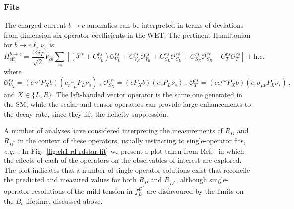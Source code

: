 \subsubsection{Fits}

The charged-current $b \to c$ anomalies can be interpreted in terms of
deviations from dimension-six operator coefficients in the WET. The pertinent
Hamiltonian for $b \to c \ell_{r} \nu_{s}$ is
\begin{equation}
  \label{eq:ch1-bctaunu-ham}
  H^{b\to c}_{\text{eff}} = \frac{4 G_{F}}{\sqrt{2}} V_{cb} \sum_{rs} [(\delta^{rs} + C^{rs}_{V_{L}}) \mathcal{O}^{rs}_{V_{L}} + C_{V_{R}}^{rs} \mathcal{O}^{rs}_{V_{R}} + C^{rs}_{S_{L}}\mathcal{O}^{rs}_{S_{L}} + C^{rs}_{S_{R}}\mathcal{O}^{rs}_{S_{R}} + C^{rs}_{T}\mathcal{O}^{rs}_{T}] + \text{h.c.}
\end{equation}
where
\begin{equation}
  \label{eq:ch1-rdrdstar-ops}
  \mathcal{O}^{rs}_{V_{X}} = (\bar{c} \gamma^{\mu} P_{X} b) (\bar{e}_{r} \gamma_{\mu} P_{L} \nu_{s}) \ , \, \mathcal{O}^{rs}_{S_{X}} = (\bar{c} P_{X} b) (\bar{e}_{r} P_{L} \nu_{s}) \ , \, \mathcal{O}^{rs}_{T} = (\bar{c} \sigma^{\mu\nu} P_{X} b) (\bar{e}_{r} \sigma_{\mu\nu} P_{L} \nu_{s}) \ ,
\end{equation}
and $X \in \{L, R\}$. The left-handed vector operator is the same one generated
in the SM, while the scalar and tensor operators can provide large enhancements
to the decay rate, since they lift the helicity-suppression.

A number of analyses have considered interpreting the measurements of $R_{D}$
and $R_{D^{*}}$ in the context of these operators, usually restricting to
single-operator fits, \textit{e.g.}~\cite{Sakaki:2013bfa, Freytsis:2015qca,
  Jung:2018lfu, Azatov:2018knx, Angelescu:2018tyl, Huang:2018nnq,
  Murgui:2019czp}. In Fig.~\ref{fig:ch1-rd-rdstar-fit} we present a plot taken from
Ref.~\cite{Murgui:2019czp} in which the effects of each of the operators on the
observables of interest are explored. The plot indicates that a number of
single-operator solutions exist that reconcile the predicted and measured values
for both $R_{D}$ and $R_{D^{*}}$, although single-operator resolutions of the
mild tension in $f_{L}^{D^{*}}$ are disfavoured by the limits on the $B_{c}$
lifetime, discussed above.

